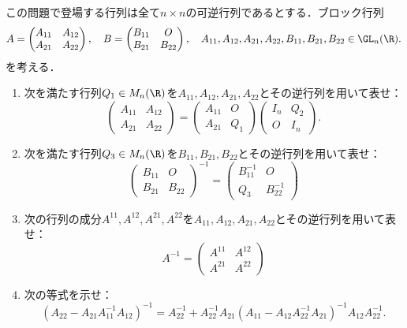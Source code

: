 \documentclass[uplatex,dvipdfmx]{jsarticle}
\begin{document}
\begin{tcolorbox}[colframe=ForestGreen, colback=ForestGreen!10!white,breakable,colbacktitle=ForestGreen!40!white,coltitle=black,fonttitle=\bfseries\sffamily,
    title=第３問]
    \begin{problem}\label{prob-20-1-3}
        この問題で登場する行列は全て$n\times n$の可逆行列であるとする．ブロック行列
        \[A=\begin{pmatrix}
            A_{11}&A_{12}\\A_{21}&A_{22}
        \end{pmatrix},\quad B=\begin{pmatrix}B_{11}&O\\B_{21}&B_{22}\end{pmatrix},\quad A_{11},A_{12},A_{21},A_{22},B_{11},B_{21},B_{22}\in\GL_n(\R).\]
        を考える．
        \begin{enumerate}
            \item 次を満たす行列$Q_1\in M_n(\R)$を$A_{11},A_{12},A_{21},A_{22}$とその逆行列を用いて表せ：
            \[\begin{pmatrix}
                A_{11}&A_{12}\\A_{21}&A_{22}
            \end{pmatrix}=\begin{pmatrix}A_{11}&O\\A_{21}&Q_1\end{pmatrix}\begin{pmatrix}I_n&Q_2\\O&I_n\end{pmatrix}.\]
            \item 次を満たす行列$Q_3\in M_n(\R)$を$B_{11},B_{21},B_{22}$とその逆行列を用いて表せ：
            \[\begin{pmatrix}
                B_{11}&O\\B_{21}&B_{22}
            \end{pmatrix}^{-1}=\begin{pmatrix}
                B_{11}^{-1}&O\\Q_3&B_{22}^{-1}
            \end{pmatrix}\]
            \item 次の行列の成分$A^{11},A^{12},A^{21},A^{22}$を$A_{11},A_{12},A_{21},A_{22}$とその逆行列を用いて表せ：
            \[A^{-1}=\begin{pmatrix}
                A^{11}&A^{12}\\A^{21}&A^{22}
            \end{pmatrix}\]
            \item 次の等式を示せ：
            \[(A_{22}-A_{21}A_{11}^{-1}A_{12})^{-1}=A_{22}^{-1}+A_{22}^{-1}A_{21}(A_{11}-A_{12}A_{22}^{-1}A_{21})^{-1}A_{12}A_{22}^{-1}.\]
        \end{enumerate}
    \end{problem}
\end{tcolorbox}
\end{document}
